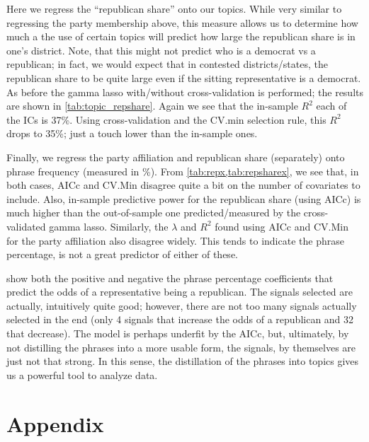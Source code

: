 \documentclass[11pt, fleqn]{article}
\begin{document}


Here we regress the ``republican share'' onto our topics.  While very similar to regressing the party membership above, this measure allows us to determine how much a the use of certain topics will predict how large the republican share is in one's district.  Note, that this might not predict who is a democrat vs a republican; in fact, we would expect that in contested districts/states, the republican share to be quite large even if the sitting representative is a democrat.  As before the gamma lasso with/without cross-validation is performed; the results are shown in \vref{tab:topic_repshare}.  Again we see that the in-sample $R^2$ each of the ICs is 37\%.  Using cross-validation and the CV.min selection rule, this $R^2$ drops to 35\%; just a touch lower than the in-sample ones.



Finally, we regress the party affiliation and republican share (separately) onto phrase frequency (measured in \%).  From \vref{tab:repx,tab:repsharex}, we see that, in both cases, AICc and CV.Min disagree quite a bit on the number of covariates to include.  Also, in-sample predictive power for the republican share (using AICc) is much higher than the out-of-sample one predicted/measured by the cross-validated gamma lasso.  Similarly, the $\lambda$ and $R^2$ found using AICc and CV.Min for the party affiliation also disagree widely.  This tends to indicate the phrase percentage, is not a great predictor of either of these. 




 show both the positive and negative the phrase percentage coefficients that predict the odds of a representative being a republican.  The signals selected are actually, intuitively quite good; however, there are not too many signals actually selected in the end (only 4 signals that increase the odds of a republican and 32 that decrease).  The model is perhaps underfit by the AICc, but, ultimately, by not distilling the phrases into a more usable form, the signals, by themselves are just not that strong.  In this sense, the distillation of the phrases into topics gives us a powerful tool to analyze data.





\clearpage
\section{Appendix}
\end{document}
